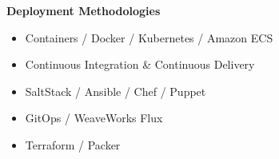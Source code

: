 \textbf{Deployment Methodologies}
\begin{itemize}
    \item Containers / Docker / Kubernetes / Amazon ECS
    \item Continuous Integration \& Continuous Delivery
    \item SaltStack / Ansible / Chef / Puppet
    \item GitOps / WeaveWorks Flux
    \item Terraform / Packer
    \\[1\baselineskip]
\end{itemize}